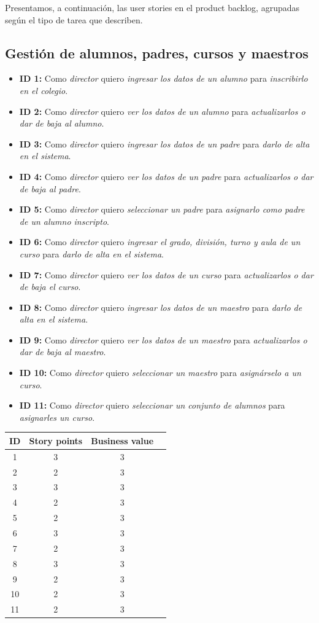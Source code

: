 \documentclass[a4paper, 10pt, twoside]{article}
\newenvironment{stories}{
  \begin{itemize}
}{
  \end{itemize}
}
\newcommand{\story}[4]{
  \item
  \textbf{ID #1:} Como \emph{#2} quiero \emph{#3} para \emph{#4}.
}
\begin{document}
Presentamos, a continuación, las user stories en el product backlog, agrupadas según el tipo de tarea que describen.


\subsection{Gestión de alumnos, padres, cursos y maestros}

\begin{stories}
  \story{1}{director}
        {ingresar los datos de un alumno}
        {inscribirlo en el colegio} 

  \story{2}{director}
        {ver los datos de un alumno}
        {actualizarlos o dar de baja al alumno} 

  \story{3}{director}
        {ingresar los datos de un padre}
        {darlo de alta en el sistema} 

  \story{4}{director}
        {ver los datos de un padre}
        {actualizarlos o dar de baja al padre} 

  \story{5}{director}
        {seleccionar un padre}
        {asignarlo como padre de un alumno inscripto} 

  \story{6}{director}
        {ingresar el grado, división, turno y aula de un curso}
        {darlo de alta en el sistema} 

  \story{7}{director}
        {ver los datos de un curso}
        {actualizarlos o dar de baja el curso} 

  \story{8}{director}
        {ingresar los datos de un maestro}
        {darlo de alta en el sistema} 

  \story{9}{director}
        {ver los datos de un maestro}
        {actualizarlos o dar de baja al maestro} 

  \story{10}{director}
        {seleccionar un maestro}
        {asignárselo a un curso} 

  \story{11}{director}
        {seleccionar un conjunto de alumnos}
        {asignarles un curso} 
\end{stories}

\begin{center}
\begin{tabular}{|c|c|c|c|}
\hline
ID & Story points & Business value\\
\hline
1 & 3 & 3\\
2 & 2 & 3\\
3 & 3 & 3\\
4 & 2 & 3\\
5 & 2 & 3\\
6 & 3 & 3\\
7 & 2 & 3\\
8 & 3 & 3\\
9 & 2 & 3\\
10 & 2 & 3\\
11 & 2 & 3\\
\hline
\end{tabular}
\end{center}
\end{document}
